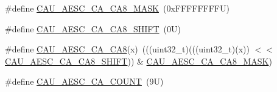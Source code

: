 \begin{DoxyCompactItemize}
\item 
\#define \mbox{\hyperlink{group___c_a_u___register___masks_ga7d4416b298869da3e7c79f6a3443f015}{C\+A\+U\+\_\+\+A\+E\+S\+C\+\_\+\+C\+A\+\_\+\+C\+A8\+\_\+\+M\+A\+SK}}~(0x\+F\+F\+F\+F\+F\+F\+F\+F\+U)
\item 
\#define \mbox{\hyperlink{group___c_a_u___register___masks_ga6498c3198edfe7b02dee8cb187511abb}{C\+A\+U\+\_\+\+A\+E\+S\+C\+\_\+\+C\+A\+\_\+\+C\+A8\+\_\+\+S\+H\+I\+FT}}~(0\+U)
\item 
\#define \mbox{\hyperlink{group___c_a_u___register___masks_ga6fb99abe4a05fc7f273d40ce62d42c3e}{C\+A\+U\+\_\+\+A\+E\+S\+C\+\_\+\+C\+A\+\_\+\+C\+A8}}(x)~(((uint32\+\_\+t)(((uint32\+\_\+t)(x)) $<$$<$ \mbox{\hyperlink{group___c_a_u___register___masks_ga6498c3198edfe7b02dee8cb187511abb}{C\+A\+U\+\_\+\+A\+E\+S\+C\+\_\+\+C\+A\+\_\+\+C\+A8\+\_\+\+S\+H\+I\+FT}})) \& \mbox{\hyperlink{group___c_a_u___register___masks_ga7d4416b298869da3e7c79f6a3443f015}{C\+A\+U\+\_\+\+A\+E\+S\+C\+\_\+\+C\+A\+\_\+\+C\+A8\+\_\+\+M\+A\+SK}})
\item 
\#define \mbox{\hyperlink{group___c_a_u___register___masks_gae56969fdcacba5af0afd5baf457ceafe}{C\+A\+U\+\_\+\+A\+E\+S\+C\+\_\+\+C\+A\+\_\+\+C\+O\+U\+NT}}~(9\+U)
\end{DoxyCompactItemize}
